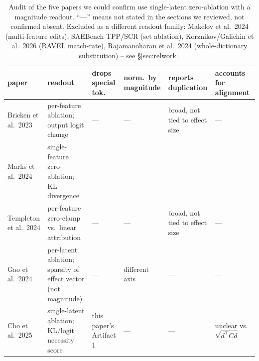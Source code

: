 \documentclass[11pt]{article}
\begin{document}
\begin{table}[t]\centering
\footnotesize
\begin{tabular}{p{2.1cm}p{3.6cm}p{1.5cm}p{1.5cm}p{1.9cm}p{1.9cm}}
\toprule
paper & readout & drops special tok. & norm.\ by magnitude & reports duplication & accounts for alignment \\
\midrule
Bricken et al.\ 2023 & per-feature ablation; output logit change & --- & --- & broad, not tied to effect size & --- \\
Marks et al.\ 2024 & single-feature zero-ablation; KL divergence & --- & --- & --- & --- \\
Templeton et al.\ 2024 & per-feature zero-clamp vs.\ linear attribution & --- & --- & broad, not tied to effect size & --- \\
Gao et al.\ 2024 & per-latent ablation; sparsity of effect vector (not magnitude) & --- & different axis & --- & --- \\
Cho et al.\ 2025 & single-latent ablation; KL/logit necessity score & this paper's Artifact 1 & --- & --- & unclear vs.\ $\sqrt{d^\top C d}$ \\
\bottomrule
\end{tabular}
\caption{Audit of the five papers we could confirm use single-latent
zero-ablation with a magnitude readout. ``---'' means not stated in the
sections we reviewed, not confirmed absent. Excluded as a different readout
family: Makelov et al.\ 2024 (multi-feature edits), SAEBench TPP/SCR (set
ablation), Korznikov/Galichin et al.\ 2026 (RAVEL match-rate), Rajamanoharan
et al.\ 2024 (whole-dictionary substitution) -- see \S\ref{sec:relwork}.}
\label{tab:audit}
\end{table}


% 
\end{document}
